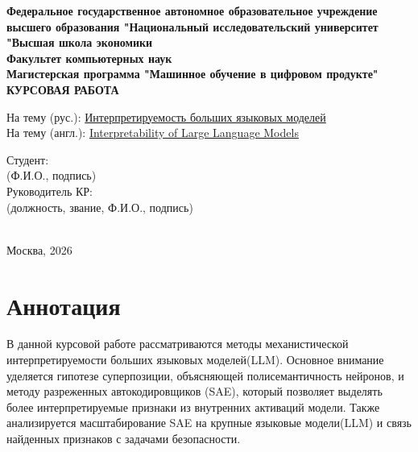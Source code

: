 \documentclass[a4paper,14pt]{extreport}
\begin{document}
\begin{titlepage}
    \begin{center}
        {\small \textbf{Федеральное государственное автономное образовательное учреждение высшего образования "Национальный исследовательский университет "Высшая школа экономики}}\\[10mm]
        {\small \textbf{Факультет компьютерных наук}}\\
        {\small \textbf{Магистерская программа "Машинное обучение в цифровом продукте"}}\\[30mm]
        
        {\bfseries \large \textbf{КУРСОВАЯ РАБОТА}}\\[20mm]
    \end{center}
    
    \begin{flushleft}
        {На тему (рус.): \underline{Интерпретируемость больших языковых моделей}}\\[3mm]
        {На тему (англ.): \underline{Interpretability of Large Language Models}}\\[30mm]
    \end{flushleft}

    \begin{center}
        \hfill\begin{minipage}{0.5\textwidth}
            \raggedright
            Студент: \hrulefill\\
            (Ф.И.О., подпись)\\[5mm]
            Руководитель КР: \hrulefill\\
            (должность, звание, Ф.И.О., подпись)
        \end{minipage}\\[30mm]
        
        {\large Москва, 2026}
    \end{center}
\end{titlepage}
\newpage

\pagestyle{empty} %
\section*{Аннотация}
В данной курсовой работе рассматриваются методы механистической интерпретируемости больших языковых моделей(LLM). Основное внимание уделяется гипотезе суперпозиции, объясняющей полисемантичность нейронов, и методу разреженных автокодировщиков (SAE), который позволяет выделять более интерпретируемые признаки из внутренних активаций модели. Также анализируется масштабирование SAE на крупные языковые модели(LLM) и связь найденных признаков с задачами безопасности.
\end{document}
